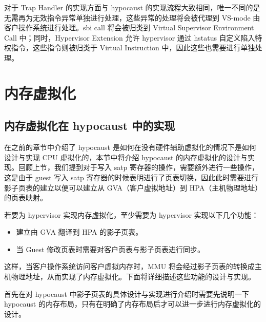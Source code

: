对于 Trap Handler 的实现方面与 hypocaust 的实现流程大致相同，唯一不同的是无需再为无效指令异常单独进行处理，这些异常的处理将会被代理到 VS-mode 由客户操作系统进行处理。sbi call 将会被归类到 Virtual Supervisor Environment Call 中；同时，Hypervisor Extension 允许 hypervisor 通过 hstatus 自定义陷入特权指令，这些指令则被归类于 Virtual Instruction 中，因此这些也需要进行单独处理。

\section{内存虚拟化}

\subsection{内存虚拟化在 hypocaust 中的实现}

在之前的章节中介绍了 hypocaust 是如何在没有硬件辅助虚拟化的情况下是如何设计与实现 CPU 虚拟化的，本节中将介绍 hypocaust 的内存虚拟化的设计与实现。回顾上节，我们提到对于写入 satp 寄存器的操作，需要额外进行一些操作，这是由于 guest 写入 satp 寄存器的时候表明进行了页表切换，因此此时需要进行影子页表的建立以便可以建立从 GVA（客户虚拟地址）到 HPA（主机物理地址）的页表映射。

若要为 hypervisor 实现内存虚拟化，至少需要为 hypervisor 实现以下几个功能：
\begin{itemize}
    \item 建立由 GVA 翻译到 HPA 的影子页表。 
    \item 当 Guest 修改页表时需要对客户页表与影子页表进行同步。  
\end{itemize}
  
这样，当客户操作系统访问客户虚拟内存时，MMU 将会经过影子页表的转换成主机物理地址，从而实现了内存虚拟化。下面将详细描述这些功能的设计与实现。  
  
首先在对 hypocaust 中影子页表的具体设计与实现进行介绍时需要先说明一下 hypocaust 的内存布局，只有在明确了内存布局后才可以进一步进行内存虚拟化的设计。


